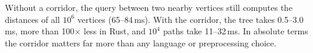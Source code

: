 Without a corridor, the query between two nearby vertices still computes the distances of all $10^6$ vertices
(65--84\,ms). With the corridor, the tree takes 0.5--3.0\,ms, more than 100$\times$ less in Rust, and $10^4$ paths
take 11--32\,ms. In absolute terms the corridor matters far more than any language or preprocessing choice.
